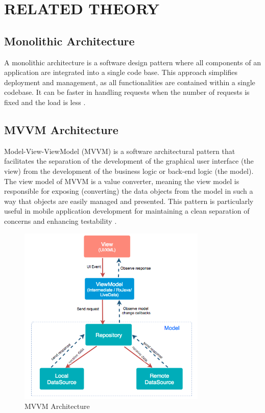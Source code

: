 \chapter{RELATED THEORY}

\section{Monolithic Architecture}
A monolithic architecture is a software design pattern where all components of an application are integrated into a single code base. This approach simplifies deployment and management, as all functionalities are contained within a single codebase. It can be faster in handling requests when the number of requests is fixed and the load is less \cite{8928192}.

\section{MVVM Architecture}
Model-View-ViewModel (MVVM) is a software architectural pattern that facilitates the separation of the development of the graphical user interface (the view) from the development of the business logic or back-end logic (the model). The view model of MVVM is a value converter, meaning the view model is responsible for exposing (converting) the data objects from the model in such a way that objects are easily managed and presented. This pattern is particularly useful in mobile application development for maintaining a clean separation of concerns and enhancing testability \cite{fowler2025presentationmodel}.

\begin{figure}[H]
    \centering
    \includegraphics[width=0.8\textwidth]{Graphics/mvvm_architecture.png}
    \caption{MVVM Architecture}
    \label{fig:mvvm_architecture}
\end{figure}

